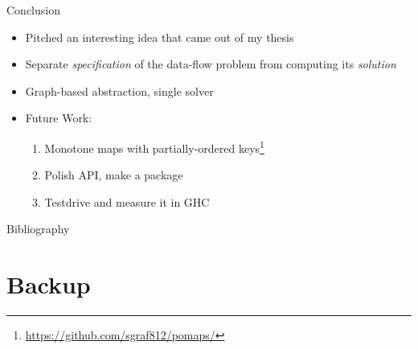 \documentclass{haskellbeamer}
\begin{document}
\begin{frame}{Conclusion}
  \begin{itemize}
    \item Pitched an interesting idea that came out of my thesis
    \item Separate \emph{specification} of the data-flow problem from computing its \emph{solution}
    \item Graph-based abstraction, single solver
    \item Future Work:
      \begin{enumerate}
        \item Monotone maps with partially-ordered keys\footnote{\url{https://github.com/sgraf812/pomaps/}}
        \item Polish API, make a package
        \item Testdrive and measure it in GHC
      \end{enumerate}
  \end{itemize}
\end{frame}

\begin{frame}{Bibliography} 
  \printbibliography[heading=none]
\end{frame}

\section{Backup}
\end{document}
